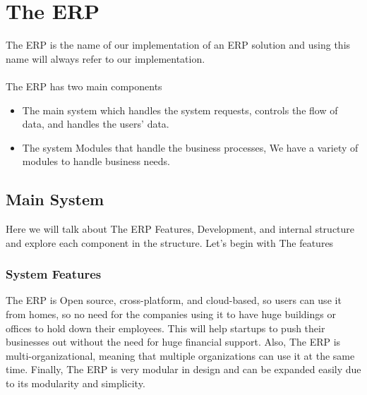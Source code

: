 

\chapter{The ERP}

The ERP is the name of our implementation of an ERP solution and using this name will always refer to our implementation.\\\\
The ERP has two main components
\begin{itemize}
    \item The main system which handles the system requests, controls the flow of data, and handles the users’ data.
    \item The system Modules that handle the business processes, We have a variety of modules to handle business needs.
\end{itemize}

\section{Main System}
Here we will talk about The ERP Features, Development, and internal structure and explore each component in the structure. Let’s begin with The features

\subsection{System Features}
The ERP is Open source, cross-platform, and cloud-based, so users can use it from homes, so no need for the companies using it to have huge buildings or offices to hold down their employees. This will help startups to push their businesses out without the need for huge financial support. Also, The ERP is multi-organizational, meaning that multiple organizations can use it at the same time. Finally, The ERP is very modular in design and can be expanded easily due to its modularity and simplicity.

